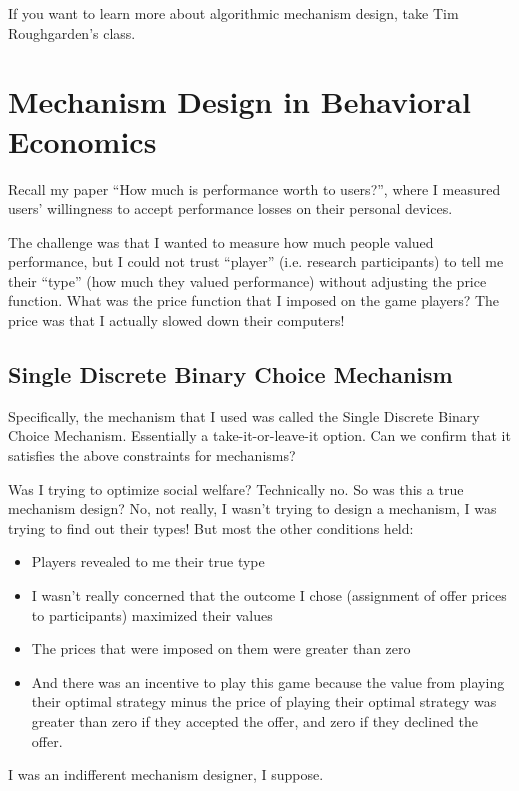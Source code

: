 \documentclass[11pt]{article}
\begin{document}
If you want to learn more about algorithmic mechanism design, take Tim Roughgarden's class. 


\section{Mechanism Design in Behavioral Economics}

Recall my paper ``How much is performance worth to users?'', where I measured users' willingness to accept performance losses on their personal devices. 

The challenge was that I wanted to measure how much people valued performance, but I could not trust ``player'' (i.e. research participants) to tell me their ``type'' (how much they valued performance) without adjusting the price function. What was the price function that I imposed on the game players? The price was that I actually slowed down their computers! 

\subsection{Single Discrete Binary Choice Mechanism}

Specifically, the mechanism that I used was called the Single Discrete Binary Choice Mechanism. Essentially a take-it-or-leave-it option. Can we confirm that it satisfies the above constraints for mechanisms? 

Was I trying to optimize social welfare? Technically no. So was this a true mechanism design? No, not really, I wasn't trying to design a mechanism, 
I was trying to find out their types! But most the other conditions held:
\begin{itemize}
    \item Players revealed to me their true type
    \item I wasn't really concerned that the outcome I chose (assignment of offer prices to participants) maximized their values 
    \item The prices that were imposed on them were greater than zero 
    \item And there was an incentive to play this game because the value from playing their optimal strategy minus the price of playing their optimal strategy was greater than zero if they accepted the offer, and zero if they declined the offer. 
\end{itemize}

I was an indifferent mechanism designer, I suppose. 
\end{document}
